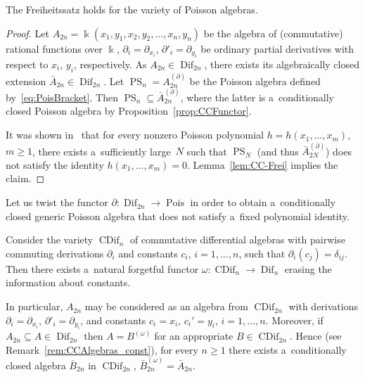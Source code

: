 \documentclass[pdftex]{sigma}
\begin{document}
\begin{corollary}
The Freiheitssatz holds for the variety of Poisson algebras.
\end{corollary}

\begin{proof}
Let $A_{2n} = \Bbbk(x_1,y_1, x_2,y_2, \dots,x_n, y_n)$ be the algebra of (commutative) rational functions over $\Bbbk$,
$\partial_i= \partial_{x_i}$, $\partial'_i=\partial_{y_i}$ be ordinary partial derivatives with respect to $x_i$, $y_i$,
respectively.
As $A_{2n}\in \operatorname{Dif}_{2n}$, there exists its algebraically closed extension $\bar A_{2n} \in \operatorname{Dif}_{2n}$.
Let $\operatorname{PS}_n = A_{2n}^{(\partial)}$ be the Poisson algebra def\/ined by~\eqref{eq:PoisBracket}.
Then $\operatorname{PS}_n \subseteq \bar A_{2n}^{(\partial)}$, where the latter is a~conditionally closed Poisson algebra by Proposition~\ref{prop:CCFunctor}.

It was shown in~\cite{FarkasI} that for every nonzero Poisson polynomial $h=h(x_1,\dots, x_m)$, $m\ge 1$, there exists
a~suf\/f\/iciently large~$N$ such that $\operatorname{PS}_N$ (and thus $\bar A_{2N}^{(\partial)}$) does not satisfy the identity
$h(x_1,\dots, x_m)=0$.
Lemma~\ref{lem:CC-Frei} implies the claim.
\end{proof}

Let us twist the functor $\partial: \operatorname{Dif}_{2n}\to \operatorname{Pois}$ in order to obtain a~conditionally closed generic Poisson algebra
that does not satisfy a~f\/ixed polynomial identity.

Consider the variety $\operatorname{CDif}_{n}$ of commutative dif\/ferential algebras with pairwise commuting derivations $\partial_i$
and constants $c_i$, $i=1,\dots, n$, such that $\partial_i(c_j)=\delta_{ij}$.
Then there exists a~natural forgetful functor $\omega: \operatorname{CDif}_n\to \operatorname{Dif}_n$ erasing the information about constants.

In particular, $A_{2n}$ may be considered as an algebra from $\operatorname{CDif}_{2n}$ with derivations $\partial_i=\partial_{x_i}$,
$\partial'_i=\partial_{y_i}$, and constants $c_i=x_i$, $c_i'=y_i$, $i=1,\dots, n$.
Moreover, if $A_{2n}\subseteq A\in \operatorname{Dif}_{2n}$ then $A=B^{(\omega)}$ for an appropriate $B\in \operatorname{CDif}_{2n}$.
Hence (see Remark~\ref{rem:CCAlgebras_const}), for every $n\ge 1$ there exists a~conditionally closed algebra $\bar
B_{2n}$ in $\operatorname{CDif}_{2n}$, $\bar B_{2n}^{(\omega)}=\bar A_{2n}$.
\end{document}
